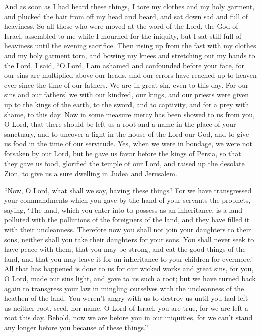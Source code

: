  And as soon as I had heard these things, I tore my clothes
and my holy garment, and plucked the hair from off my head and beard,
and sat down sad and full of heaviness.  So all those who
were moved at the word of the Lord, the God of Israel, assembled to me
while I mourned for the iniquity, but I sat still full of heaviness
until the evening sacrifice.  Then rising up from the fast
with my clothes and my holy garment torn, and bowing my knees and
stretching out my hands to the Lord,  I said, ``O Lord, I
am ashamed and confounded before your face,  for our sins
are multiplied above our heads, and our errors have reached up to heaven
 ever since the time of our fathers. We are in great sin,
even to this day.  For our sins and our fathers' we with
our kindred, our kings, and our priests were given up to the kings of
the earth, to the sword, and to captivity, and for a prey with shame, to
this day.  Now in some measure mercy has been showed to us
from you, O Lord, that there should be left us a root and a name in the
place of your sanctuary,  and to uncover a light in the
house of the Lord our God, and to give us food in the time of our
servitude.  Yes, when we were in bondage, we were not
forsaken by our Lord, but he gave us favor before the kings of Persia,
so that they gave us food,  glorified the temple of our
Lord, and raised up the desolate Zion, to give us a sure dwelling in
Judea and Jerusalem.

 ``Now, O Lord, what shall we say, having these things? For
we have transgressed your commandments which you gave by the hand of
your servants the prophets, saying,  `The land, which you
enter into to possess as an inheritance, is a land polluted with the
pollutions of the foreigners of the land, and they have filled it with
their uncleanness.  Therefore now you shall not join your
daughters to their sons, neither shall you take their daughters for your
sons.  You shall never seek to have peace with them, that
you may be strong, and eat the good things of the land, and that you may
leave it for an inheritance to your children for evermore.'
 All that has happened is done to us for our wicked works
and great sins, for you, O Lord, made our sins light,  and
gave to us such a root; but we have turned back again to transgress your
law in mingling ourselves with the uncleanness of the heathen of the
land.  You weren't angry with us to destroy us until you
had left us neither root, seed, nor name.  O Lord of
Israel, you are true, for we are left a root this day. 
Behold, now we are before you in our iniquities, for we can't stand any
longer before you because of these things.''

